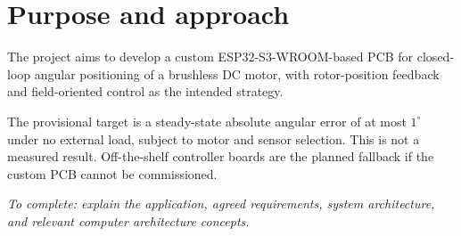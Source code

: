 \section{Purpose and approach}
The project aims to develop a custom ESP32-S3-WROOM-based PCB for closed-loop angular positioning of a brushless DC motor, with rotor-position feedback and field-oriented control as the intended strategy.

The provisional target is a steady-state absolute angular error of at most \(1^\circ\) under no external load, subject to motor and sensor selection. This is not a measured result. Off-the-shelf controller boards are the planned fallback if the custom PCB cannot be commissioned.

\textit{To complete: explain the application, agreed requirements, system architecture, and relevant computer architecture concepts.}
